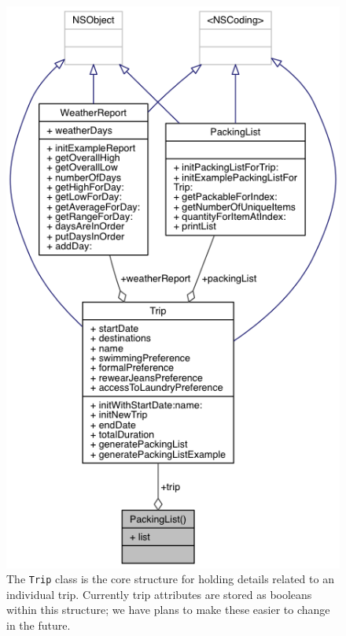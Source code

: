 \documentclass[11pt]{article}
\begin{document}
    \begin{figure}
        \centering
        \includegraphics[scale=0.75]{img/trip_inheritance.png}
        \caption{The \texttt{Trip} class is the core structure for holding details related to an individual trip. Currently trip attributes are stored as booleans within this structure; we have plans to make these easier to change in the future.}
        \label{fig:tripclass}
    \end{figure}
\end{document}
